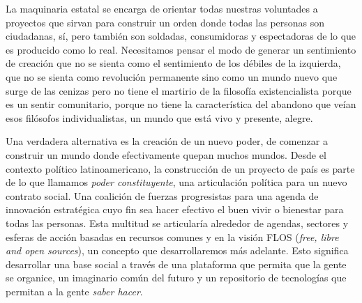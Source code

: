 La maquinaria estatal se encarga de orientar todas nuestras voluntades a proyectos que sirvan para construir un orden donde todas las personas son ciudadanas, sí, pero también son soldadas, consumidoras y espectadoras de lo que es producido como lo real. Necesitamos pensar el modo de generar un sentimiento de creación que no se sienta como el sentimiento de los débiles de la izquierda, que no se sienta como revolución permanente sino como un mundo nuevo que surge de las cenizas pero no tiene el martirio de la filosofía existencialista porque es un sentir comunitario, porque no tiene la característica del abandono que veían esos filósofos individualistas, un mundo que está vivo y presente, alegre.

Una verdadera alternativa es la creación de un nuevo poder, de comenzar a construir un mundo donde efectivamente quepan muchos mundos. Desde el contexto político latinoamericano, la construcción de un proyecto de país es parte de lo que llamamos \emph{poder constituyente}, una articulación política para un nuevo contrato social. Una coalición de fuerzas progresistas para una agenda de innovación estratégica cuyo fin sea hacer efectivo el buen vivir o bienestar para todas las personas. Esta multitud se articularía alrededor de agendas, sectores y esferas de acción basadas en recursos comunes y en la visión FLOS (\emph{free, libre and open sources}), un concepto que desarrollaremos más adelante. Esto significa desarrollar una base social a través de una plataforma que permita que la gente se organice, un imaginario común del futuro y un repositorio de tecnologías que permitan a la gente \emph{saber hacer}.
